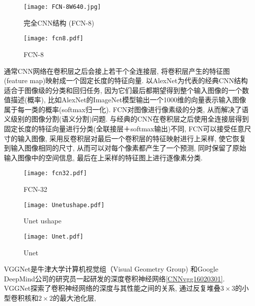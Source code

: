\begin{figure}[H]
    \centering
    \texttt{[image: FCN-8W640.jpg]}
    \caption{完全CNN结构 (FCN-8)\cite{PiramanayagamSaber2018-9591}}
    \label{FCN-8W640}\vspace{-0.4cm}
\end{figure}
\begin{figure}[H]
    \centering
    \texttt{[image: fcn8.pdf]}
    \caption{FCN-8}
    \label{CNNfcn80203}\vspace{-0.4cm}
\end{figure}
通常CNN网络在卷积层之后会接上若干个全连接层, 将卷积层产生的特征图(feature map)映射成一个固定长度的特征向量. 
以AlexNet为代表的经典CNN结构适合于图像级的分类和回归任务, 因为它们最后都期望得到整个输入图像的一个数值描述(概率), 比如AlexNet的ImageNet模型输出一个1000维的向量表示输入图像属于每一类的概率(softmax归一化). 
FCN对图像进行像素级的分类, 从而解决了语义级别的图像分割(语义分割)问题. 
与经典的CNN在卷积层之后使用全连接层得到固定长度的特征向量进行分类(全联接层＋softmax输出)不同, FCN可以接受任意尺寸的输入图像, 采用反卷积层对最后一个卷积层的特征映射进行上采样, 
使它恢复到输入图像相同的尺寸, 从而可以对每个像素都产生了一个预测, 同时保留了原始输入图像中的空间信息, 最后在上采样的特征图上进行逐像素分类.
\begin{figure}[H]
    \centering
    \texttt{[image: fcn32.pdf]}
    \caption{FCN-32}
    \label{CNNfcn320203}
    \vspace{-0.4cm}
\end{figure}
\begin{figure}[H]
    \centering
    \texttt{[image: Unetushape.pdf]}
    \caption{Unet ushape}
    \label{CNNUnetushape0203}
    \vspace{-0.4cm}
\end{figure}
\begin{figure}[H]
    \centering
    \texttt{[image: Unet.pdf]}
    \caption{Unet}
    \label{CNNUnet0203}
    \vspace{-0.4cm}
\end{figure}
VGGNet是牛津大学计算机视觉组（Visual Geometry Group) 和Google DeepMind公司的研究员一起研发的深度卷积神经网络\ref{CNNvgg16020301}.
VGGNet探索了卷积神经网络的深度与其性能之间的关系, 通过反复堆叠$3\times 3$的小型卷积核和$2\times 2$的最大池化层,

